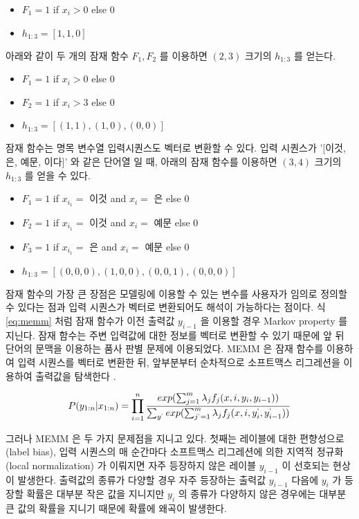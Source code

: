 \documentclass[oneside, ko,phd]{snuthesis_utf8_kor}
\begin{document}
\begin{itemize}
  \item $F_1 = 1$ if $x_i > 0$ else $0$
  \item $h_{1:3} = [1, 1, 0]$
\end{itemize}

아래와 같이 두 개의 잠재 함수 $F_1, F_2$ 를 이용하면 $(2, 3)$ 크기의 $h_{1:3}$ 를 얻는다.

\begin{itemize}
  \item $F_1 = 1$ if $x_i > 0$ else $0$
  \item $F_2 = 1$ if $x_i > 3$ else $0$
  \item $h_{1:3} = [(1, 1), (1, 0), (0, 0)]$
\end{itemize}

잠재 함수는 명목 변수열 입력시퀀스도 벡터로 변환할 수 있다.
입력 시퀀스가 '[이것, 은, 예문, 이다]' 와 같은 단어열 일 때, 아래의 잠재 함수를 이용하면 $(3, 4)$ 크기의 $h_{1:3}$ 를 얻을 수 있다.

\begin{itemize}
  \item $F_1 = 1$ if $x_{i_1} =$ 이것 and $x_{i} =$ 은 else $0$
  \item $F_2 = 1$ if $x_{i_1} =$ 이것 and $x_{i} =$ 예문 else $0$
  \item $F_3 = 1$ if $x_{i_1} =$ 은 and $x_{i} =$ 예문 else $0$
  \item $h_{1:3} = [(0, 0, 0), (1, 0, 0), (0, 0, 1), (0, 0, 0)]$
\end{itemize}

잠재 함수의 가장 큰 장점은 모델링에 이용할 수 있는 변수를 사용자가 임의로 정의할 수 있다는 점과 입력 시퀀스가 벡터로 변환되어도 해석이 가능하다는 점이다.
식 \ref{eq:memm} 처럼 잠재 함수가 이전 출력값 $y_{i-1}$ 을 이용할 경우 Markov property 를 지닌다.
잠재 함수는 주변 입력값에 대한 정보를 벡터로 변환할 수 있기 때문에 앞 뒤 단어의 문맥을 이용하는 품사 판별 문제에 이용되었다.
MEMM 은 잠재 함수를 이용하여 입력 시퀀스를 벡터로 변환한 뒤, 앞부분부터 순차적으로 소프트맥스 리그레션을 이용하여 출력값을 탐색한다 \cite{mccallum2000maximum}.

\begin{equation}
  \label{eq:memm}
  P(y_{1:n} \vert x_{1:n}) = \prod_{i=1}^{n} \frac{exp(\sum_{j=1}^{m} \lambda_j f_j (x, i, y_i, y_{i-1}))}{ \sum_{y^{`}} exp(\sum_{j^{`}=1}^{m} \lambda_j f_j (x, i, y_i^{`}, y_{i-1}^{`})) }
\end{equation}

그러나 MEMM 은 두 가지 문제점을 지니고 있다.
첫째는 레이블에 대한 편향성으로 (label bias), 입력 시퀀스의 매 순간마다 소프트맥스 리그레션에 의한 지역적 정규화 (local normalization) 가 이뤄지면 자주 등장하지 않은 레이블 $y_{i-1}$ 이 선호되는 현상이 발생한다\cite{lafferty2001conditional, kudo2004applying, andor2016globally}.
출력값의 종류가 다양할 경우 자주 등장하는 출력값 $y_{i-1}$ 다음에 $y_i$ 가 등장할 확률은 대부분 작은 값을 지니지만 $y_i$ 의 종류가 다양하지 않은 경우에는 대부분 큰 값의 확률을 지니기 때문에 확률에 왜곡이 발생한다.
\end{document}
